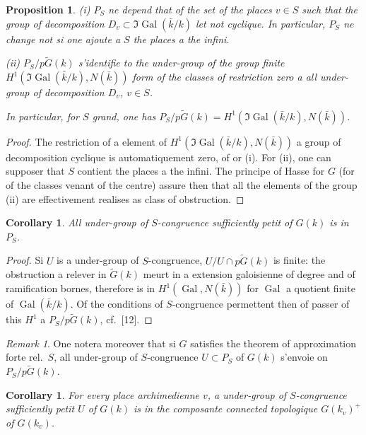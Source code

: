 \documentclass[12pt,a4paper]{article}
\theoremstyle{plain}
\newtheorem{proposition}[theorem]{Proposition}
\newtheorem{corollary}[theorem]{Corollary}
\theoremstyle{definition}
\theoremstyle{remark}
\newtheorem{remark}[theorem]{Remark}
\DeclareMathOperator{\Gal}{Gal}
\begin{document}
\begin{proposition}
\textup{(i)} $P_S$ ne depend that of the set of the places $v \in S$ such that the group of decomposition $D_v \subset \Im \Gal(\bar{k}/k)$ let not cyclique. In particular, $P_S$ ne change not si one ajoute a $S$ the places a the infini.

\textup{(ii)} $P_S/p\tilde{G}(k)$ s'identifie to the under-group of the group finite $H^1(\Im \Gal(\bar{k}/k), N(\bar{k}))$ form of the classes of restriction zero a all under-group of decomposition $D_v$, $v \in S$.

In particular, for $S$ grand, one has $P_S/p\tilde{G}(k) = H^1(\Im \Gal(\bar{k}/k), N(\bar{k}))$.
\end{proposition}

\begin{proof}
The restriction of a element of $H^1(\Im \Gal(\bar{k}/k), N(\bar{k}))$ a group of decomposition cyclique is automatiquement zero, of or (i). For (ii), one can supposer that $S$ contient the places a the infini. The principe of Hasse for $G$ (for of the classes venant of the centre) assure then that all the elements of the group (ii) are effectivement realises as class of obstruction.
\end{proof}

\begin{corollary}
All under-group of $S$-congruence sufficiently petit of $G(k)$ is in $P_S$.
\end{corollary}

\begin{proof}
Si $U$ is a under-group of $S$-congruence, $U/U \cap p\tilde{G}(k)$ is finite: the obstruction a relever in $\tilde{G}(k)$ meurt in a extension galoisienne of degree and of ramification bornes, therefore is in $H^1(\Gal, N(\bar{k}))$ for $\Gal$ a quotient finite of $\Gal(\bar{k}/k)$. Of the conditions of $S$-congruence permettent then of passer of this $H^1$ a $P_S/p\tilde{G}(k)$, cf.~[12].
\end{proof}

\begin{remark}
One notera moreover that si $G$ satisfies the theorem of approximation forte rel.~$S$, all under-group of $S$-congruence $U \subset P_S$ of $G(k)$ s'envoie on $P_S/p\tilde{G}(k)$.
\end{remark}

\begin{corollary}
For every place archimedienne $v$, a under-group of $S$-congruence sufficiently petit $U$ of $G(k)$ is in the composante connected topologique $G(k_v)^+$ of $G(k_v)$.
\end{corollary}
\end{document}

